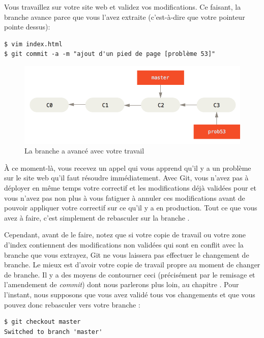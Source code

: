 Vous travaillez sur votre site web et validez vos modifications.
Ce faisant, la branche  avance parce que vous l'avez extraite (c'est-à-dire que votre pointeur  pointe dessus):
\begin{Schunk}
\begin{Verbatim}
$ vim index.html
$ git commit -a -m "ajout d'un pied de page [problème 53]"
\end{Verbatim}
\end{Schunk}

\begin{figure}[H]
  \centering
  \includegraphics{images/basic-branching-3}
  \caption{La branche  a avancé avec votre travail}
  \label{fig:git:basic-branching-3}
\end{figure}

À ce moment-là, vous recevez un appel qui vous apprend qu'il y a un problème sur le site web qu'il faut résoudre immédiatement.
Avec Git, vous n'avez pas à déployer en même temps votre correctif et les modifications déjà validées pour  et vous n'avez pas non plus à vous fatiguer à annuler ces modifications avant de pouvoir appliquer votre correctif sur ce qu'il y a en production.
Tout ce que vous avez à faire, c'est simplement de rebasculer sur la branche .

Cependant, avant de le faire, notez que si votre copie de travail ou votre zone d'index contiennent des modifications non validées qui sont en conflit avec la branche que vous extrayez, Git ne vous laissera pas effectuer le changement de branche.
Le mieux est d'avoir votre copie de travail propre au moment de changer de branche.
Il y a des moyens de contourner ceci (précisément par le remisage et l'amendement de \emph{commit}) dont nous parlerons plus loin, au chapitre .
Pour l'instant, nous supposons que vous avez validé tous vos changements et que vous pouvez donc rebasculer vers votre branche :
\begin{Schunk}
\begin{Verbatim}
$ git checkout master
Switched to branch 'master'
\end{Verbatim}
\end{Schunk}

